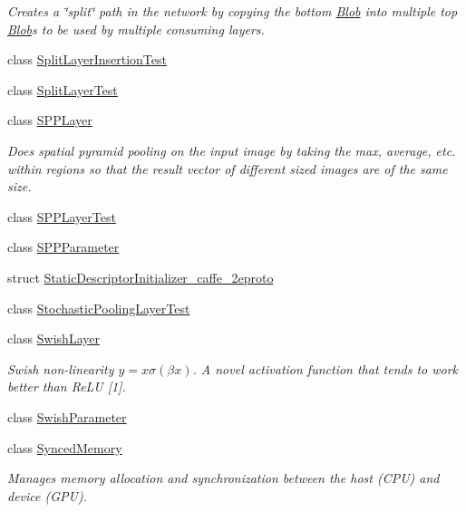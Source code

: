 \begin{DoxyCompactItemize}
\begin{DoxyCompactList}\small\item\em Creates a \char`\"{}split\char`\"{} path in the network by copying the bottom \mbox{\hyperlink{classcaffe_1_1_blob}{Blob}} into multiple top \mbox{\hyperlink{classcaffe_1_1_blob}{Blob}}s to be used by multiple consuming layers. \end{DoxyCompactList}\item 
class \mbox{\hyperlink{classcaffe_1_1_split_layer_insertion_test}{Split\+Layer\+Insertion\+Test}}
\item 
class \mbox{\hyperlink{classcaffe_1_1_split_layer_test}{Split\+Layer\+Test}}
\item 
class \mbox{\hyperlink{classcaffe_1_1_s_p_p_layer}{S\+P\+P\+Layer}}
\begin{DoxyCompactList}\small\item\em Does spatial pyramid pooling on the input image by taking the max, average, etc. within regions so that the result vector of different sized images are of the same size. \end{DoxyCompactList}\item 
class \mbox{\hyperlink{classcaffe_1_1_s_p_p_layer_test}{S\+P\+P\+Layer\+Test}}
\item 
class \mbox{\hyperlink{classcaffe_1_1_s_p_p_parameter}{S\+P\+P\+Parameter}}
\item 
struct \mbox{\hyperlink{structcaffe_1_1_static_descriptor_initializer__caffe__2eproto}{Static\+Descriptor\+Initializer\+\_\+caffe\+\_\+2eproto}}
\item 
class \mbox{\hyperlink{classcaffe_1_1_stochastic_pooling_layer_test}{Stochastic\+Pooling\+Layer\+Test}}
\item 
class \mbox{\hyperlink{classcaffe_1_1_swish_layer}{Swish\+Layer}}
\begin{DoxyCompactList}\small\item\em Swish non-\/linearity $ y = x \sigma (\beta x) $. A novel activation function that tends to work better than Re\+LU \mbox{[}1\mbox{]}. \end{DoxyCompactList}\item 
class \mbox{\hyperlink{classcaffe_1_1_swish_parameter}{Swish\+Parameter}}
\item 
class \mbox{\hyperlink{classcaffe_1_1_synced_memory}{Synced\+Memory}}
\begin{DoxyCompactList}\small\item\em Manages memory allocation and synchronization between the host (C\+PU) and device (G\+PU). \end{DoxyCompactList}\item 

\end{DoxyCompactItemize}
